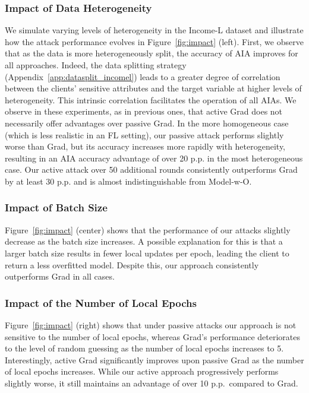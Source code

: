 \subsubsection{Impact of Data Heterogeneity} 
We simulate varying levels of heterogeneity in the Income-L dataset and illustrate how the attack performance evolves in Figure~\ref{fig:impact} (left). First, we observe that as the data is more heterogeneously split, the accuracy of AIA improves for all approaches. 
Indeed, the data splitting strategy (Appendix~\ref{app:datasplit_incomel}) leads to a greater degree of correlation between the clients' sensitive attributes and the target variable at higher levels of heterogeneity. This intrinsic correlation facilitates the operation of all AIAs.
We observe in these experiments, as in previous ones, that active Grad does not necessarily offer advantages over passive Grad. In the more homogeneous case (which is less realistic in an FL setting), our passive attack performs slightly worse than Grad, but its accuracy increases more rapidly with heterogeneity, resulting in an AIA accuracy advantage of over 20 p.p. in the most heterogeneous case.
Our active attack over 50 additional rounds consistently outperforms Grad by at least 30 p.p. and is almost indistinguishable from \mbox{Model-w-O}.

\subsubsection{Impact of Batch Size} 
Figure~\ref{fig:impact} (center) shows that the performance of our attacks slightly decrease as the batch size increases.  A possible explanation for this is that a larger batch size results in fewer local updates per epoch, leading the client to return a less overfitted model. Despite this, our approach consistently outperforms Grad in all cases.
\subsubsection{Impact of the Number of Local Epochs}
Figure~\ref{fig:impact} (right) shows that under passive attacks our approach is not sensitive to the number of local epochs, whereas Grad's performance deteriorates to the level of random guessing as the number of local epochs increases to 5. Interestingly, active Grad significantly improves upon passive Grad as the number of local epochs increases. While our active approach progressively performs slightly worse, it still maintains an advantage of over 10 p.p.~compared to Grad.

